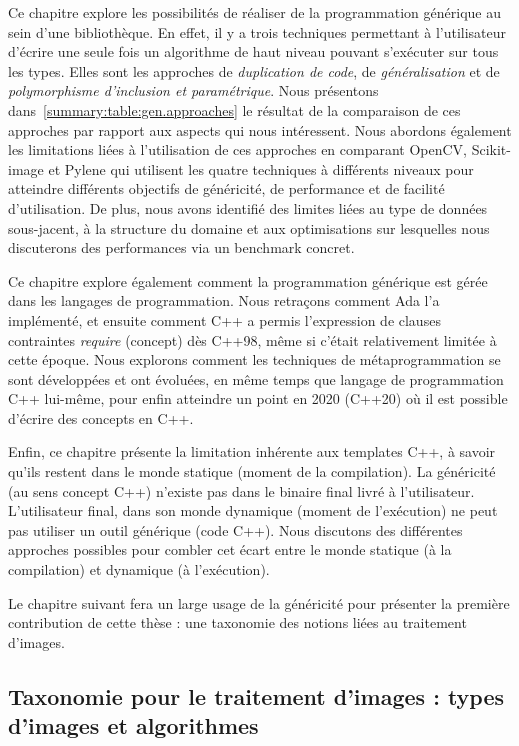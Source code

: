 Ce chapitre explore les possibilités de réaliser de la programmation générique au sein d'une bibliothèque. En effet, il
y a trois techniques permettant à l'utilisateur d'écrire une seule fois un algorithme de haut niveau pouvant s'exécuter
sur tous les types. Elles sont les approches de \emph{duplication de code}, de \emph{généralisation} et de
\emph{polymorphisme d'inclusion et paramétrique}. Nous présentons dans~\cref{summary:table:gen.approaches} le résultat
de la comparaison de ces approches par rapport aux aspects qui nous intéressent. Nous abordons également les limitations
liées à l'utilisation de ces approches en comparant OpenCV, Scikit-image et Pylene qui utilisent les quatre techniques à
différents niveaux pour atteindre différents objectifs de généricité, de performance et de facilité d'utilisation. De
plus, nous avons identifié des limites liées au type de données sous-jacent, à la structure du domaine et aux
optimisations sur lesquelles nous discuterons des performances via un benchmark concret.

Ce chapitre explore également comment la programmation générique est gérée dans les langages de programmation. Nous
retraçons comment Ada l'a implémenté, et ensuite comment C++ a permis l'expression de clauses contraintes \emph{require}
(concept) dès C++98, même si c'était relativement limitée à cette époque. Nous explorons comment les techniques de
métaprogrammation se sont développées et ont évoluées, en même temps que langage de programmation C++ lui-même, pour
enfin atteindre un point en 2020 (C++20) où il est possible d'écrire des concepts en C++.

Enfin, ce chapitre présente la limitation inhérente aux templates C++, à savoir qu'ils restent dans le monde statique
(moment de la compilation). La généricité (au sens concept C++) n'existe pas dans le binaire final livré à
l'utilisateur. L'utilisateur final, dans son monde dynamique (moment de l'exécution) ne peut pas utiliser un outil
générique (code C++). Nous discutons des différentes approches possibles pour combler cet écart entre le monde statique
(à la compilation) et dynamique (à l'exécution).

Le chapitre suivant fera un large usage de la généricité pour présenter la première contribution de cette thèse : une
taxonomie des notions liées au traitement d'images.


\subsection*{Taxonomie pour le traitement d'images : types d'images et algorithmes}


